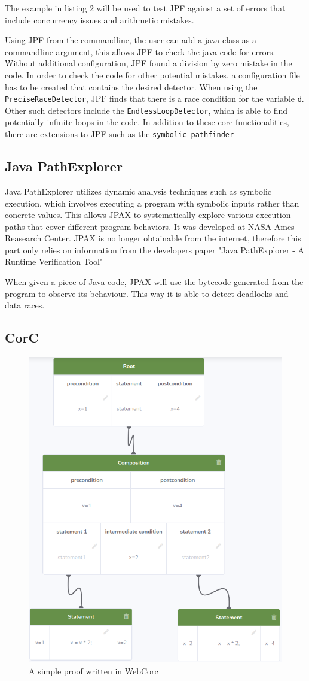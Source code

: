 The example in listing 2 will be used to test JPF against a set of errors that include concurrency issues and arithmetic mistakes. 

Using JPF from the commandline, the user can add a java class as a commandline argument, this allows JPF to check the java code for errors. Without additional configuration, JPF found a division by zero mistake in the code. In order to check the code for other potential mistakes, a configuration file has to be created that contains the desired detector. When using the \verb|PreciseRaceDetector|, JPF finds that there is a race condition for the variable \verb|d|. Other such detectors include the \verb|EndlessLoopDetector|, which is able to find potentially infinite loops in the code. In addition to these core functionalities, there are extensions to JPF such as the \verb|symbolic pathfinder|\citep{jpf-symbc}

\subsection{Java PathExplorer}

Java PathExplorer utilizes dynamic analysis techniques such as symbolic execution, which involves executing a program with symbolic inputs rather than concrete values. This allows JPAX to systematically explore various execution paths that cover different program behaviors. It was developed at NASA Ames Reasearch Center. JPAX is no longer obtainable from the internet, therefore this part only relies on information from the developers paper "Java PathExplorer - A Runtime Verification Tool" \citep{HR1}

When given a piece of Java code, JPAX will use the bytecode generated from the program to observe its behaviour. This way it is able to detect deadlocks and data races. 

\subsection{CorC}
\begin{figure}[h!]
	\centering
	\includegraphics[width=0.5\linewidth]{"Bildschirmfoto von 2023-05-16 15-43-13"}
	\caption{A simple proof written in WebCorc\citep{WebCorC}}
	\label{fig:bildschirmfoto-von-2023-05-16-15-43-13}
\end{figure}

